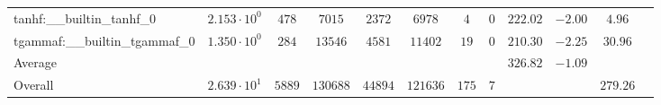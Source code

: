 \begin{tabular}{|l|c|c|c|c|c|c|c|c|c|c|c|}
tanhf:\_\_builtin\_tanhf\_0               & $ 2.153 \cdot 10^{0}  $ & $ 478    $ & $ 7015   $ & $ 2372  $ & $ 6978   $ & $ 4   $ & $ 0 $ & $ 222.02      $ & $ -2.00   $ & $ 4.96    $ \\
tgammaf:\_\_builtin\_tgammaf\_0           & $ 1.350 \cdot 10^{0}  $ & $ 284    $ & $ 13546  $ & $ 4581  $ & $ 11402  $ & $ 19  $ & $ 0 $ & $ 210.30      $ & $ -2.25   $ & $ 30.96   $ \\
\hline
Average                                   & $                     $ & $        $ & $        $ & $       $ & $        $ & $     $ & $   $ & $ 326.82      $ & $ -1.09   $ & $         $ \\
\hline
Overall                                   & $ 2.639 \cdot 10^{1}  $ & $ 5889   $ & $ 130688 $ & $ 44894 $ & $ 121636 $ & $ 175 $ & $ 7 $ & $             $ & $         $ & $ 279.26  $ \\
\hline
\end{tabular}
